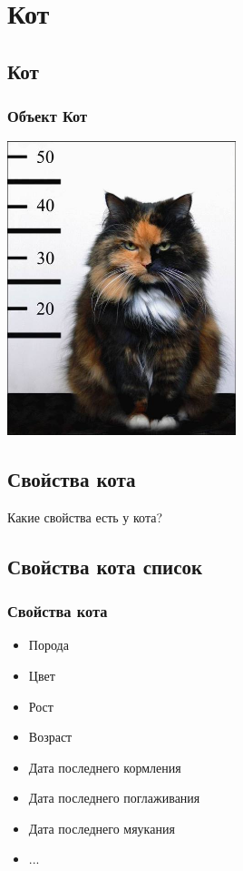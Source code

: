 \documentclass[compress,red]{beamer}
\begin{document}
\section{Кот}

\subsection{Кот}
\begin{frame}
  \frametitle{Объект Кот}
	\centerline{\includegraphics[width=0.5\textwidth]{images/catE.jpg}}
\end{frame}

\subsection{Свойства кота}
\begin{frame}
  \begin{center}
    \Huge{Какие свойства есть у кота?}
  \end{center}
\end{frame}

\subsection{Свойства кота список}
\begin{frame}[fragile]
  \frametitle{Свойства кота}
  \begin{itemize}
    \item Порода
    \item Цвет
    \item Рост
    \item Возраст
    \item Дата последнего кормления
    \item Дата последнего поглаживания
    \item Дата последнего мяукания
    \item ...
  \end{itemize}
\end{frame}
\end{document}
